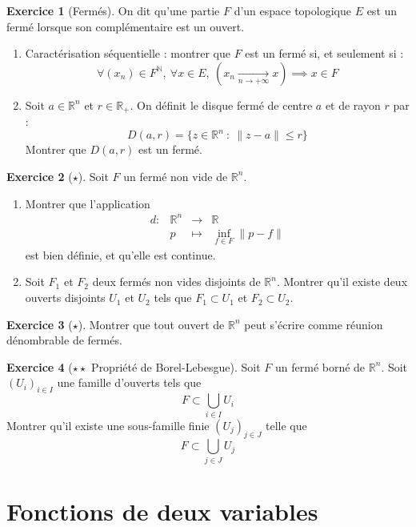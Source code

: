 \documentclass[french]{book}
\newcommand{\N}{\mathbb{N}}
\newcommand{\R}{\mathbb{R}}
\theoremstyle{definition}
\newtheorem{ex}{Exercice}[chapter]
\theoremstyle{theorem}
\theoremstyle{remark}
\begin{document}
\begin{ex}[Fermés]
	On dit qu'une partie $F$ d'un espace topologique $E$ est un fermé lorsque son complémentaire est un ouvert.
	\begin{enumerate}
		\item Caractérisation séquentielle : montrer que $F$ est un fermé si, et seulement si : $$\forall (x_n)\in F^\N,\ \forall x\in E,\ \left(x_n\xrightarrow[n\to+\infty]{}x\right)\implies x\in F$$
		\item Soit $a\in\R^n$ et $r\in\R_+$. On définit le disque fermé de centre $a$ et de rayon $r$ par : $$D(a,r)=\{z\in\R^n \ :\ \lVert z-a\rVert\leqslant r\}$$ Montrer que $D(a,r)$ est un fermé.
	\end{enumerate}
\end{ex}

\begin{ex}[$\star$]
	Soit $F$ un fermé non vide de $\R^n$.
	\begin{enumerate}
		\item Montrer que l'application $$\begin{array}{lrcl}
			d:&\R^n&\longrightarrow&\R \\
			&p&\longmapsto&\underset{f\in F}{\inf}\lVert p-f\rVert
		\end{array}$$ est bien définie, et qu'elle est continue.
		\item Soit $F_1$ et $F_2$ deux fermés non vides disjoints de $\R^n$. Montrer qu'il existe deux ouverts disjoints $U_1$ et $U_2$ tels que $F_1\subset U_1$ et $F_2\subset U_2$.
	\end{enumerate}
\end{ex}

\begin{ex}[$\star$]
	Montrer que tout ouvert de $\R^n$ peut s'écrire comme réunion dénombrable de fermés.
\end{ex}

\begin{ex}[$\star\star$ Propriété de Borel-Lebesgue]
	Soit $F$ un fermé borné de $\R^n$. Soit $(U_i)_{i\in I}$ une famille d'ouverts  tels que $$F\subset\bigcup_{i\in I}U_i$$ Montrer qu'il existe une sous-famille finie $(U_j)_{j\in J}$ telle que $$F\subset \bigcup_{j\in J}U_j$$
\end{ex}

\section{Fonctions de deux variables}
\end{document}
